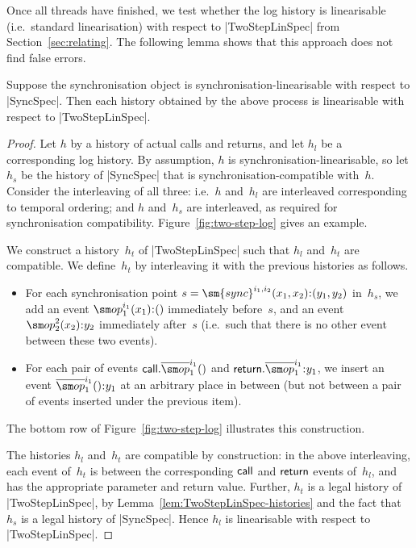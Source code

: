 Once all threads have finished, we test whether the log history is
linearisable (i.e.~standard linearisation) with respect to |TwoStepLinSpec|
from Section~\ref{sec:relating}.
%
The following lemma shows that this approach does not find false errors.
%
\begin{lemma}
\label{lem:two-step-testing}
Suppose the synchronisation object is synchronisation-lin\-ear\-is\-able with
respect to |SyncSpec|.  Then each history obtained by the above process is
linearisable with respect to |TwoStepLinSpec|.
\end{lemma}


\begin{proof}
Let $h$ by a history of actual calls and returns, and let $h_l$ be a
corresponding log history.  By assumption, $h$ is
synchronisation-linearisable, so let $h_s$ be the history of |SyncSpec| that
is synchronisation-compatible with~$h$.  Consider the interleaving of all
three: i.e.~$h$ and~$h_l$ are interleaved corresponding to temporal ordering;
and $h$ and~$h_s$ are interleaved, as required for synchronisation
compatibility.  Figure~\ref{fig:two-step-log} gives an example.

We construct a history~$h_t$ of |TwoStepLinSpec| such that $h_l$ and~$h_t$ are
compatible.  We define~$h_t$ by interleaving it with the previous
histories as follows. 
\begin{itemize}
\item For each synchronisation point $s =
  \sm{sync}^{i_1,i_2}(x_1,x_2)\::(y_1,y_2)$ in~$h_s$, we add an event
  $\op_1^{i_1}(x_1)\::()$ immediately before~$s$, and an event
  $\op_2^2(x_2)\::y_2$ immediately after~$s$ (i.e.~such that there is no
  other event between these two events).

\item For each pair of events $\call.\overline\op_1^{i_1}()$ and
  $\return.\overline\op_1^{i_1}\::y_1$, we insert an event
  $\overline\op_1^{i_1}()\::y_1$ at an arbitrary place in between (but not
  between a pair of events inserted under the previous item).
\end{itemize}
%
The bottom row of Figure~\ref{fig:two-step-log} illustrates this construction.

The histories $h_l$ and~$h_t$ are compatible by construction: in the above
interleaving, each event of~$h_t$ is between the corresponding $\mathsf{call}$ and
$\mathsf{return}$ events of~$h_l$, and has the appropriate parameter and return value.
%
Further, $h_t$ is a legal history of |TwoStepLinSpec|, by
Lemma~\ref{lem:TwoStepLinSpec-histories} and the fact that $h_s$ is a legal
history of |SyncSpec|.
%
Hence $h_l$ is linearisable with respect to |TwoStepLinSpec|.
\end{proof}

